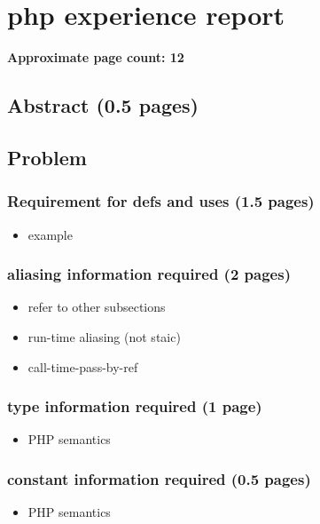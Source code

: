 \applynumberofpages\chapter{php experience report }


\textbf{Approximate page count: 12}

\section{Abstract (0.5 pages)}

\section{Problem}

\subsection{Requirement for defs and uses (1.5 pages)}
\begin{itemize}
	\item example
\end{itemize}

\subsection{aliasing information required (2 pages)}
\begin{itemize}
	\item refer to other subsections
	\item run-time aliasing (not staic)
	\item call-time-pass-by-ref
\end{itemize}

\subsection{type information required (1 page)}
\begin{itemize}
	\item PHP semantics
\end{itemize}

\subsection{constant information required (0.5 pages)}
\begin{itemize}
	\item PHP semantics
\end{itemize}

